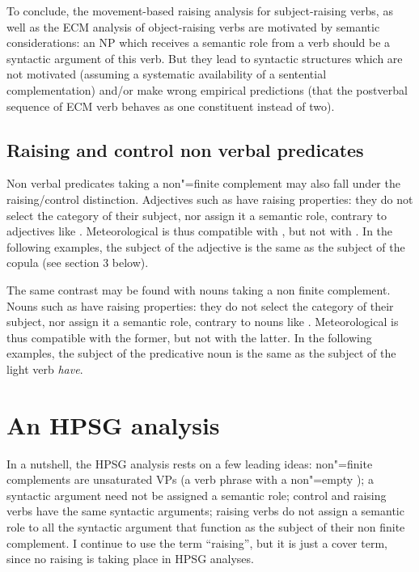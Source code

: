 \documentclass[output=paper
                ,modfonts
                ,nonflat
	        ,collection
	        ,collectionchapter
	        ,collectiontoclongg
 	        ,biblatex
                ,babelshorthands
                ,newtxmath
                ,draftmode
                ,colorlinks, citecolor=brown
]{./langsci/langscibook}
\begin{document}
To conclude, the movement-based raising analysis for subject-raising verbs, as well as the ECM analysis of object-raising verbs are motivated by semantic considerations: an NP which receives a semantic role from a verb should be a syntactic argument of this verb. But they lead to syntactic structures which are not motivated (assuming a systematic availability of a sentential complementation) and/or make wrong empirical predictions (that the postverbal sequence of ECM verb behaves as one constituent instead of two).
 
\subsection{Raising and control non verbal predicates}\label{nonverbal}

Non verbal predicates taking a non"=finite complement may also fall under the raising/control distinction.  Adjectives such as  have raising properties: they do not select the category of their subject, nor assign it a semantic role, contrary to adjectives like . Meteorological  is thus compatible with , but not with . In the following examples, the subject of the adjective is the same as the subject of the copula (see section 3 below).

\eal
{}
\zl

The same contrast may be found with  nouns taking a non finite complement. Nouns such as  have raising properties: they do not select the category of their subject, nor assign it a semantic role, contrary to nouns like . Meteorological  is thus compatible with the former, but not with the latter. In the following examples, the subject of the predicative noun is the same as the subject of the light verb \emph{have}.


\eal
{}
\zl

\section{An HPSG analysis}


In a nutshell, the HPSG analysis rests on a few leading ideas: non"=finite complements are unsaturated VPs (a verb phrase with a non"=empty \subjl); a syntactic argument need not be assigned a semantic role; control and raising verbs have the same syntactic arguments; raising verbs do not assign a semantic role to all the syntactic argument that function as the subject of their non finite complement. I continue to use the term ``raising'', but it is just a cover term, since no raising is taking place in HPSG analyses.
\end{document}
